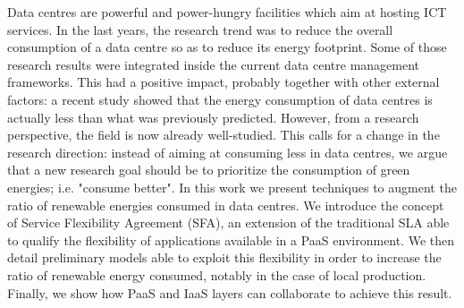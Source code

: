 
Data centres are powerful and power-hungry facilities which aim at hosting ICT services.
In the last years, the research trend was to reduce the overall consumption of a data centre so as to reduce its energy footprint.
Some of those research results were integrated inside the current data centre management frameworks.
This had a positive impact, probably together with other external factors: a recent study showed that the energy consumption of data centres is actually less than what was previously predicted.
However, from a research perspective, the field is now already well-studied.
This calls for a change in the research direction: instead of aiming at consuming less in data centres, we argue that a new research goal should be to prioritize the consumption of green energies; i.e. "consume better".
In this work we present techniques to augment the ratio of renewable energies consumed in data centres.
We introduce the concept of Service Flexibility Agreement (SFA), an extension of the traditional SLA able to qualify the flexibility of applications available in a PaaS environment.
We then detail preliminary models able to exploit this flexibility in order to increase the ratio of renewable energy consumed, notably in the case of local production.
Finally, we show how PaaS and IaaS layers can collaborate to achieve this result.
